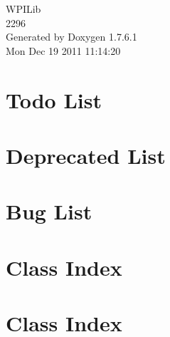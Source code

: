 \documentclass[a4paper]{book}
\begin{document}
\hypersetup{pageanchor=false,citecolor=blue}
\begin{titlepage}
\vspace*{7cm}
\begin{center}
{\Large \-W\-P\-I\-Lib \\[1ex]\large 2296 }\\
\vspace*{1cm}
{\large \-Generated by Doxygen 1.7.6.1}\\
\vspace*{0.5cm}
{\small Mon Dec 19 2011 11:14:20}\\
\end{center}
\end{titlepage}
\clearemptydoublepage
{}
\tableofcontents
\clearemptydoublepage
{}
\hypersetup{pageanchor=true,citecolor=blue}
\chapter{\-Todo \-List}
\label{todo}
\hypertarget{todo}{}

\chapter{\-Deprecated \-List}
\label{deprecated}
\hypertarget{deprecated}{}

\chapter{\-Bug \-List}
\label{bug}
\hypertarget{bug}{}

\chapter{\-Class \-Index}

\chapter{\-Class \-Index}

\end{document}

